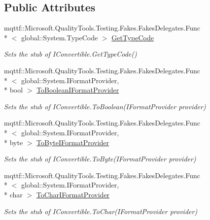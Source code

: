 \subsection*{Public Attributes}
\begin{DoxyCompactItemize}
\item 
mqttf\-::\-Microsoft.\-Quality\-Tools.\-Testing.\-Fakes.\-Fakes\-Delegates.\-Func\\*
$<$ global\-::\-System.\-Type\-Code $>$ \hyperlink{class_system_1_1_fakes_1_1_stub_i_convertible_afcb4fd2ad35d314c92a231f3d121a55d}{Get\-Type\-Code}
\begin{DoxyCompactList}\small\item\em Sets the stub of I\-Convertible.\-Get\-Type\-Code()\end{DoxyCompactList}\item 
mqttf\-::\-Microsoft.\-Quality\-Tools.\-Testing.\-Fakes.\-Fakes\-Delegates.\-Func\\*
$<$ global\-::\-System.\-I\-Format\-Provider, \\*
bool $>$ \hyperlink{class_system_1_1_fakes_1_1_stub_i_convertible_aed2935f0f946256fdf8cf2a4b0d0b4e4}{To\-Boolean\-I\-Format\-Provider}
\begin{DoxyCompactList}\small\item\em Sets the stub of I\-Convertible.\-To\-Boolean(\-I\-Format\-Provider provider)\end{DoxyCompactList}\item 
mqttf\-::\-Microsoft.\-Quality\-Tools.\-Testing.\-Fakes.\-Fakes\-Delegates.\-Func\\*
$<$ global\-::\-System.\-I\-Format\-Provider, \\*
byte $>$ \hyperlink{class_system_1_1_fakes_1_1_stub_i_convertible_a94d48c953053fa112e68f9856fe72226}{To\-Byte\-I\-Format\-Provider}
\begin{DoxyCompactList}\small\item\em Sets the stub of I\-Convertible.\-To\-Byte(\-I\-Format\-Provider provider)\end{DoxyCompactList}\item 
mqttf\-::\-Microsoft.\-Quality\-Tools.\-Testing.\-Fakes.\-Fakes\-Delegates.\-Func\\*
$<$ global\-::\-System.\-I\-Format\-Provider, \\*
char $>$ \hyperlink{class_system_1_1_fakes_1_1_stub_i_convertible_a581fc7861c2e91176f9d485ace33c9ae}{To\-Char\-I\-Format\-Provider}
\begin{DoxyCompactList}\small\item\em Sets the stub of I\-Convertible.\-To\-Char(\-I\-Format\-Provider provider)\end{DoxyCompactList}\item 

\end{DoxyCompactItemize}
